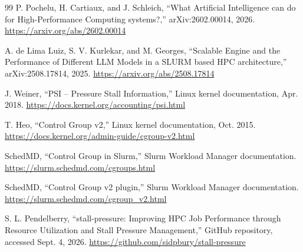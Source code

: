 \documentclass[11pt]{article}
\begin{document}
\begin{thebibliography}{99}
P. Pochelu, H. Cartiaux, and J. Schleich,
``What Artificial Intelligence can do for High-Performance Computing systems?,''
arXiv:2602.00014, 2026.
\url{https://arxiv.org/abs/2602.00014}

A. de Lima Luiz, S. V. Kurlekar, and M. Georges,
``Scalable Engine and the Performance of Different LLM Models in a SLURM based HPC architecture,''
arXiv:2508.17814, 2025.
\url{https://arxiv.org/abs/2508.17814}

J. Weiner,
``PSI -- Pressure Stall Information,''
Linux kernel documentation, Apr. 2018.
\url{https://docs.kernel.org/accounting/psi.html}

T. Heo,
``Control Group v2,''
Linux kernel documentation, Oct. 2015.
\url{https://docs.kernel.org/admin-guide/cgroup-v2.html}

SchedMD,
``Control Group in Slurm,''
Slurm Workload Manager documentation.
\url{https://slurm.schedmd.com/cgroups.html}

SchedMD,
``Control Group v2 plugin,''
Slurm Workload Manager documentation.
\url{https://slurm.schedmd.com/cgroup_v2.html}

S. L. Pendelberry,
``stall-pressure: Improving HPC Job Performance through Resource Utilization and Stall Pressure Management,''
GitHub repository, accessed Sept. 4, 2026.
\url{https://github.com/sidpbury/stall-pressure}

\end{thebibliography}
\end{document}
